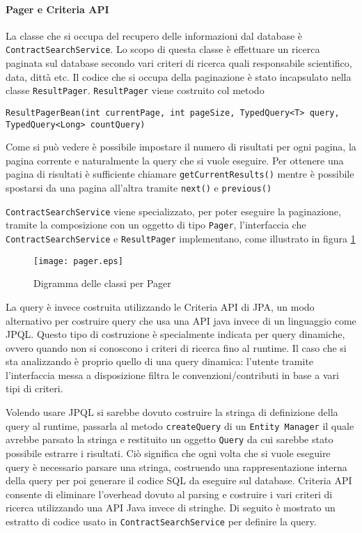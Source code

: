 \paragraph{Pager e Criteria API}

La classe che si occupa del recupero delle informazioni dal database è \texttt{ContractSearchService}. Lo scopo di questa classe è effettuare un ricerca paginata sul database secondo vari criteri di ricerca quali 
responsabile scientifico, data, dittà etc. Il codice che si occupa della paginazione è stato incapsulato nella classe \texttt{ResultPager}. \texttt{ResultPager} viene costruito
col metodo

\lstinline{ResultPagerBean(int currentPage, int pageSize, TypedQuery<T> query, TypedQuery<Long> countQuery)}

Come si può vedere è possibile impostare il numero di risultati per ogni pagina, la pagina corrente e naturalmente la query che si vuole eseguire. Per ottenere una pagina di risultati è sufficiente chiamare \lstinline{getCurrentResults()}
mentre è possibile spostarsi da una pagina all'altra tramite \lstinline{next()} e \lstinline{previous()}

\texttt{ContractSearchService} viene specializzato, per poter eseguire la paginazione, tramite la composizione con un oggetto di tipo \texttt{Pager}, l'interfaccia che \texttt{ContractSearchService} e \texttt{ResultPager} implementano, come
illustrato in figura \ref{pager}


\begin{figure}[h]
  \caption{Digramma delle classi per Pager}
  \label{pager}
  \centering
    \texttt{[image: pager.eps]}
\end{figure}

La query è invece costruita utilizzando le Criteria API di JPA, un modo alternativo per costruire query che usa una API java invece di un linguaggio
come JPQL. Questo tipo di costruzione è specialmente indicata per query dinamiche, ovvero quando non si conoscono i criteri di ricerca fino al runtime.
Il caso che si sta analizzando è proprio quello di una query dinamica: l'utente tramite l'interfaccia messa a disposizione filtra le convenzioni/contributi
in base a vari tipi di criteri.

Volendo usare JPQL si sarebbe dovuto costruire la stringa di definizione della query al runtime, passarla al metodo \lstinline{createQuery} di un
\texttt{Entity Manager} il quale avrebbe parsato la stringa e restituito un oggetto \texttt{Query} da cui sarebbe stato possibile estrarre i risultati.
Ciò significa che ogni volta che si vuole eseguire query è necessario parsare una stringa, costruendo una rappresentazione interna della query per poi generare il codice SQL da
eseguire sul database. Criteria API consente di eliminare l'overhead dovuto al parsing e costruire i vari criteri di ricerca utilizzando una API Java invece
di stringhe. Di seguito è mostrato un estratto di codice usato in \texttt{ContractSearchService} per definire la query.

